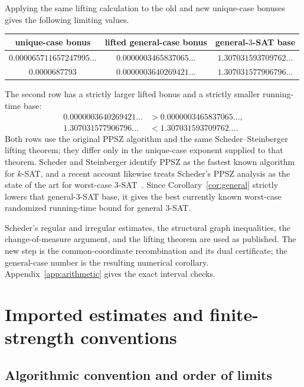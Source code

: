 \documentclass[11pt]{article}
\begin{document}
Applying the same lifting calculation to the old and new unique-case bonuses gives the following limiting values.
\begin{center}
\small
\renewcommand{\arraystretch}{1.15}
\begin{tabular}{@{}ccc@{}}
\toprule
unique-case bonus & lifted general-case bonus & general-$3$-SAT base\\
\midrule
$0.000065711657247995\ldots$
 & $0.0000003465837065\ldots$
 & $1.307031593709762\ldots$\\
$0.0000687793$
 & $0.0000003640269421\ldots$
 & $1.307031577906796\ldots$\\
\bottomrule
\end{tabular}
\end{center}
The second row has a strictly larger lifted bonus and a strictly smaller running-time base:
\begin{align*}
 0.0000003640269421\ldots
 &>0.0000003465837065\ldots,\\
 1.307031577906796\ldots
 &<1.307031593709762\ldots.
\end{align*}
Both rows use the original PPSZ algorithm and the same Scheder--Steinberger lifting theorem; they differ only in the unique-case exponent supplied to that theorem.  Scheder and Steinberger identify PPSZ as the fastest known algorithm for $k$-SAT, and a recent account likewise treats Scheder's PPSZ analysis as the state of the art for worst-case $3$-SAT~\cite{SchederSteinberger,AttiasGaoReyzin}.  Since Corollary~\ref{cor:general} strictly lowers that general-$3$-SAT base, it gives the best currently known worst-case randomized running-time bound for general $3$-SAT.

Scheder's regular and irregular estimates, the structural graph inequalities, the change-of-measure argument, and the lifting theorem are used as published.  The new step is the common-coordinate recombination and its dual certificate; the general-case number is the resulting numerical corollary.  Appendix~\ref{app:arithmetic} gives the exact interval checks.

\section{Imported estimates and finite-strength conventions}\label{sec:inputs}

\subsection{Algorithmic convention and order of limits}\label{sec:finite-strength}
\end{document}
